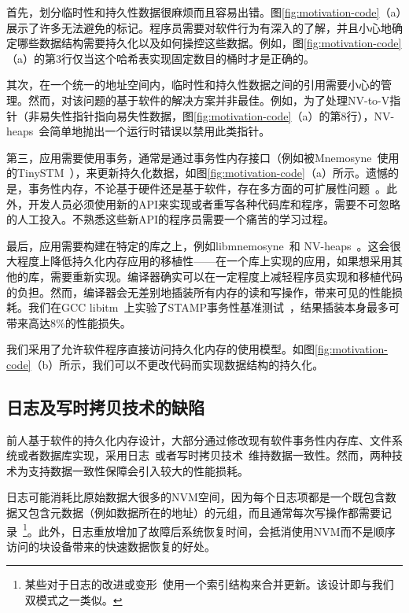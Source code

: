 首先，划分临时性和持久性数据很麻烦而且容易出错。图\ref{fig:motivation-code}（a）展示了许多无法避免的标记。程序员需要对软件行为有深入的了解，并且小心地确定哪些数据结构需要持久化以及如何操控这些数据。例如，图\ref{fig:motivation-code}（a）的第3行仅当这个哈希表实现固定数目的桶时才是正确的。

其次，在一个统一的地址空间内，临时性和持久性数据之间的引用需要小心的管理。然而，对该问题的基于软件的解决方案并非最佳。例如，为了处理NV-to-V指针（非易失性指针指向易失性数据，图\ref{fig:motivation-code}（a）的第8行），NV-heaps~\cite{Coburn:2011:NMP:1950365.1950380}会简单地抛出一个运行时错误以禁用此类指针。

第三，应用需要使用事务，通常是通过事务性内存接口（例如被Mnemosyne~\cite{Volos:2011:MLP:1950365.1950379}使用的TinySTM~\cite{Felber:2008:DPT}），来更新持久化数据，如图\ref{fig:motivation-code}（a）所示。遗憾的是，事务性内存，不论基于硬件还是基于软件，存在多方面的可扩展性问题~\cite{Cascaval:2008:STM:1454456.1454466,Pankratius:2011:STM:1989493.1989500,Dice:2009:EEC:1508244.1508263}。此外，开发人员必须使用新的API来实现或者重写各种代码库和程序，需要不可忽略的人工投入。不熟悉这些新API的程序员需要一个痛苦的学习过程。

最后，应用需要构建在特定的库之上，例如libmnemosyne~\cite{Volos:2011:MLP:1950365.1950379}和
NV-heaps~\cite{Coburn:2011:NMP:1950365.1950380}。这会很大程度上降低持久化内存应用的移植性——在一个库上实现的应用，如果想采用其他的库，需要重新实现。编译器确实可以在一定程度上减轻程序员实现和移植代码的负担。然而，编译器会无差别地插装所有内存的读和写操作，带来可见的性能损耗。我们在GCC libitm~\cite{libitm}上实验了STAMP事务性基准测试~\cite{Cao:2008:STA}，结果插装本身最多可带来高达8\%的性能损失。

我们采用了允许软件程序直接访问持久化内存的使用模型。如图\ref{fig:motivation-code}（b）所示，我们可以不更改代码而实现数据结构的持久化。

\subsection{日志及写时拷贝技术的缺陷}

前人基于软件的持久化内存设计，大部分通过修改现有软件事务性内存库、文件系统或者数据库实现，采用日志~\cite{Volos:2011:MLP:1950365.1950379, Coburn:2011:NMP:1950365.1950380}或者写时拷贝技术~\cite{Condit:2009:BIT:1629575.1629589,
Venkataraman:2011:CDD:1960475.1960480}维持数据一致性。然而，两种技术为支持数据一致性保障会引入较大的性能损耗。

日志可能消耗比原始数据大很多的NVM空间，因为每个日志项都是一个既包含数据又包含元数据（例如数据所在的地址）的元组，而且通常每次写操作都需要记录~\cite{Volos:2011:MLP:1950365.1950379,
Coburn:2011:NMP:1950365.1950380}\footnote{某些对于日志的改进或变形~\cite{1003568}使用一个索引结构来合并更新。该设计即与我们双模式之一类似。}。此外，日志重放增加了故障后系统恢复时间，会抵消使用NVM而不是顺序访问的块设备带来的快速数据恢复的好处。

